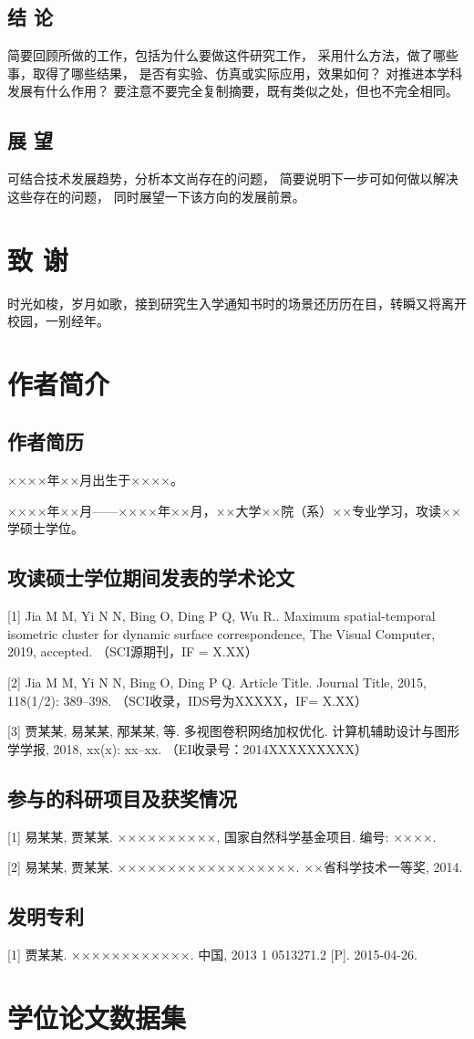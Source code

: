 \documentclass[12pt]{zjutbook}
\begin{document}
\section{结  论}
简要回顾所做的工作，包括为什么要做这件研究工作，
采用什么方法，做了哪些事，取得了哪些结果，
是否有实验、仿真或实际应用，效果如何？
对推进本学科发展有什么作用？
要注意不要完全复制摘要，既有类似之处，但也不完全相同。
\section{展  望}
可结合技术发展趋势，分析本文尚存在的问题，
简要说明下一步可如何做以解决这些存在的问题，
同时展望一下该方向的发展前景。

\backmatter



\chapter{致  谢}
时光如梭，岁月如歌，接到研究生入学通知书时的场景还历历在目，转瞬又将离开校园，一别经年。

\chapter{作者简介}
\section{作者简历}
××××年××月出生于××××。

××××年××月——××××年××月，××大学××院（系）××专业学习，攻读××学硕士学位。

\section{攻读硕士学位期间发表的学术论文}
[1]	Jia M M, Yi N N, Bing O, Ding P Q, Wu R.. Maximum spatial-temporal isometric cluster for dynamic surface correspondence, The Visual Computer, 2019, accepted. （SCI源期刊，IF = X.XX）

[2]	Jia M M, Yi N N, Bing O, Ding P Q. Article Title. Journal Title, 2015, 118(1/2): 389–398. （SCI收录，IDS号为XXXXX，IF= X.XX）

[3]	贾某某, 易某某, 邴某某, 等. 多视图卷积网络加权优化. 计算机辅助设计与图形学学报, 2018, xx(x): xx–xx. （EI收录号：2014XXXXXXXXX）

\section{参与的科研项目及获奖情况}
[1]	易某某, 贾某某. ××××××××××, 国家自然科学基金项目. 编号: ××××.

[2]	易某某, 贾某某. ××××××××××××××××××. ××省科学技术一等奖, 2014.

\section{发明专利}
[1]	贾某某. ××××××××××××. 中国, 2013 1 0513271.2 [P]. 2015-04-26.

\chapter{学位论文数据集}
\end{document}
